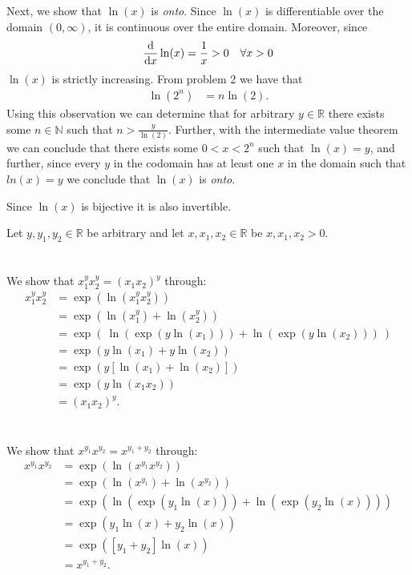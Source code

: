 \documentclass[12 pt,letterpaper]{article}
\begin{document}
Next, we show that \(\ln(x)\) is \emph{onto}.
%
Since \(\ln(x)\) is differentiable over the domain \((0,\infty)\),
it is continuous over the entire domain.
Moreover, since 
\[\dv{x}\ln(x)=\frac{1}{x}>0 \quad\forall x>0\]
\(\ln(x)\) is strictly increasing.
%
From problem 2 we have that
\begin{align*}
    \ln(2^n) &= n\ln(2).
\end{align*}
Using this observation we can determine that for arbitrary \(y\in\mathbb{R}\)
there exists some \(n\in\mathbb{N}\) such that \(n>\frac{y}{\ln(2)}\).
Further, with the intermediate value theorem
we can conclude that there exists some \(0<x<2^n\) such that \(\ln(x)=y\),
and further, since every \(y\) in the codomain has at least one \(x\) in the domain
such that \(ln(x) = y\) we conclude that \(\ln(x)\) is \emph{onto}.

Since \(\ln(x)\) is bijective it is also invertible.


\clearpage
Let \(y,y_1,y_2 \in\mathbb{R}\) be arbitrary
and let \(x,x_1,x_2 \in\mathbb{R}\)
be \(x,x_1,x_2 >0\).

\section{}
We show that \(x^y_1 x^y_2 = (x_1x_2)^y\) through:
\begin{align*}
    x^y_1 x^y_2
    &= \exp(\ln(x^y_1 x^y_2)) \\
    &= \exp(\ln(x^y_1) + \ln(x^y_2)) \\
    &= \exp(\ \ln(\exp(y\ln(x_1))) + \ln(\exp(y\ln(x_2)))\ ) \\
    &= \exp(y\ln(x_1) + y\ln(x_2)) \\
    &= \exp(y[\ln(x_1) + \ln(x_2)] ) \\
    &= \exp(y\ln(x_1x_2)) \\
    &= (x_1x_2)^y.
\end{align*}

\section{}
We show that \(x^{y_1} x^{y_2} = x^{y_1+y_2}\) through:
\begin{align*}
    x^{y_1} x^{y_2}
    &= \exp(\ln(x^{y_1} x^{y_2})) \\
    &= \exp(\ln(x^{y_1}) + \ln(x^{y_2})) \\
    &= \exp(\ln(\exp(y_1\ln(x))) + \ln(\exp(y_2\ln(x)))) \\
    &= \exp(y_1\ln(x) + y_2\ln(x)) \\
    &= \exp([y_1+y_2]\ln(x)) \\
    &= x^{y_1+y_2}.
\end{align*}
\end{document}
